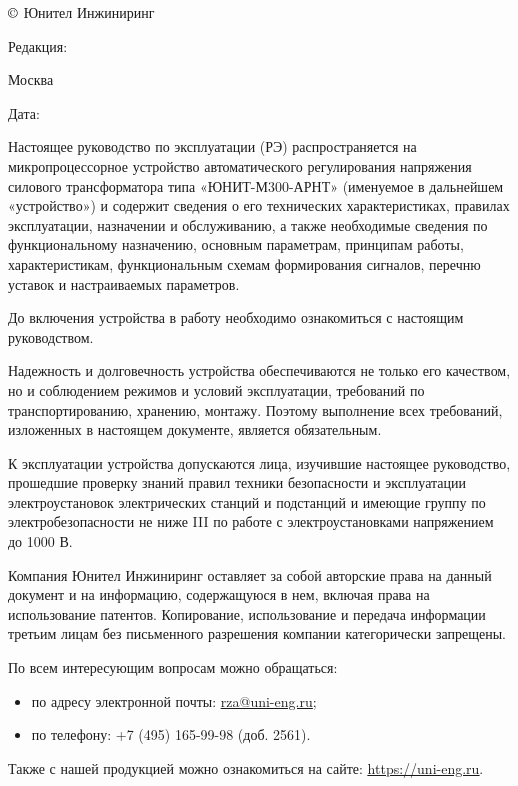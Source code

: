 \pagestyle{fancy}
\fancyhf{}
\renewcommand{\headrulewidth}{1pt}
\lhead{\color{black}{ЮТКБ.656122.609 РЭ9 Редакция \rev~от~\revdate}}
\rfoot{{\thepage}}
\renewcommand{\footrulewidth}{1pt}


\pagecolor{white}

\noindent
$\copyright$ \the\year{} Юнител Инжиниринг
\hfill
\parbox{0.3\textwidth}{\raggedleft Редакция: \textcolor{unigray}{\rev}}

\vskip 3mm
\noindent
Москва
\hfill
\parbox{0.3\textwidth}{\raggedleft Дата: \textcolor{unigray}{\revdate}}
\vskip 8mm

\vskip 10mm

\par
Настоящее руководство по эксплуатации (РЭ) распространяется на микропроцессорное устройство автоматического регулирования напряжения силового трансформатора типа «ЮНИТ-М300-АРНТ» (именуемое в дальнейшем «устройство») и содержит сведения о его технических характеристиках, правилах эксплуатации, назначении и обслуживанию, а также необходимые сведения по функциональному назначению, основным параметрам, принципам работы, характеристикам, функциональным схемам формирования сигналов, перечню уставок и настраиваемых параметров.
\medskip
\par
До включения устройства в работу необходимо ознакомиться с настоящим руководством.
\medskip
\par
Надежность и долговечность устройства обеспечиваются не только его качеством, но и соблюдением режимов и условий эксплуатации, требований по транспортированию, хранению, монтажу. Поэтому выполнение всех требований, изложенных в настоящем документе, является обязательным. 
\medskip
\par
К эксплуатации устройства допускаются лица, изучившие настоящее руководство, прошедшие проверку знаний правил техники безопасности и эксплуатации электроустановок электрических станций и подстанций и имеющие группу по электробезопасности не ниже III по работе с электроустановками напряжением до 1000 В.


\vskip 75mm
\par
Компания Юнител Инжиниринг оставляет за собой авторские права на данный документ и на информацию, содержащуюся в нем, включая права на использование патентов. Копирование, использование и передача информации третьим лицам без письменного разрешения компании категорически запрещены.

\vskip 10mm
\par
По всем интересующим вопросам можно обращаться:
\begin{itemize}
\item по адресу электронной почты: \href{mailto:rza@uni-eng.ru}{\color{uniblue}\uline{rza@uni-eng.ru}};
\item по телефону: +7 (495) 165-99-98 (доб. 2561).
\end{itemize}
Также с нашей продукцией можно ознакомиться на сайте: \href{https://uni-eng.ru}{\color{uniblue}\uline{https://uni-eng.ru}}.
